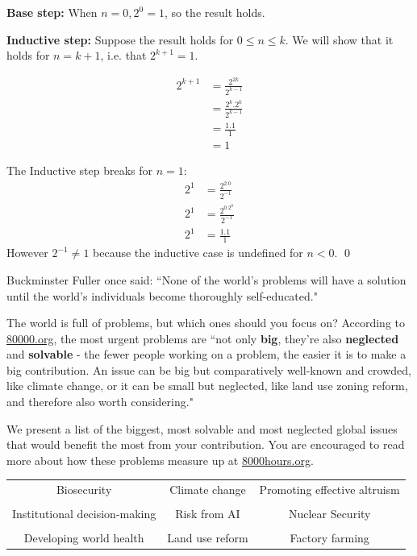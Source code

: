 \documentclass[addpoints]{exam}
\begin{document}
\begin{questions}
\begin{parts}
  \textbf{Base step:} When $n=0, 2^0=1$, so the result holds.
  
  \textbf{Inductive step:} Suppose the result holds for $0\leq n \leq k$. We will show that it holds for $n=k+1$, i.e. that $2^{k+1}=1$.
  
  \begin{align*}
      2^{k+1} &= \frac{2^{2k}}{2^{k-1}}\\
      &= \frac{2^k.2^k}{2^{k-1}}\\
      &= \frac{1.1}{1}\\
      &= 1
  \end{align*}

  \begin{solution}
    The Inductive step breaks for $n=1$:
    \begin{align*}
    2^{1} &= \frac{2^{2.0}}{2^{-1}}\\
    2^{1} &= \frac{2^0.2^0}{2^{-1}}\\
    2^{1} &= \frac{1.1}{1}
    \end{align*} 
    However $2^{-1} \not = 1$ because the inductive case is undefined for $n < 0$. \qed
  \end{solution}
\end{parts}

\question Buckminster Fuller once said: ``None of the world’s problems will have a solution until the world’s individuals become thoroughly self-educated."

The world is full of problems, but which ones should you focus on? According to \href{http://8000hours.org}{80000.org}, the most urgent problems are ``not only \textbf{big}, they're also \textbf{neglected} and \textbf{solvable} - the fewer people working on a problem, the easier it is to make a big contribution. An issue can be big but comparatively well-known and crowded, like climate change, or it can be small but neglected, like land use zoning reform, and therefore also worth considering."

We present a list of the biggest, most solvable and most neglected global issues that would benefit the most from your contribution. You are encouraged to read more about how these problems measure up at \href{https://80000hours.org/articles/cause-selection/}{8000hours.org}.
\begin{center}
\begin{tabular}{ c c c}
Biosecurity & Climate change & Promoting effective altruism\\\\
Institutional decision-making & Risk from AI & Nuclear Security\\\\
Developing world health & Land use reform & Factory farming
\end{tabular}
\end{center}


\end{questions}
\end{document}
